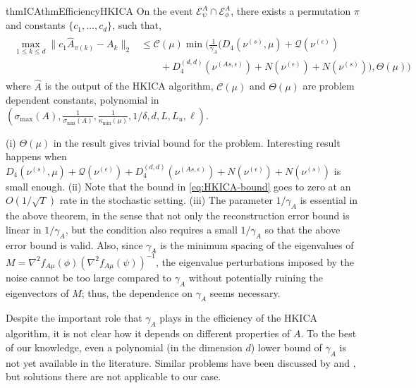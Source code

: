 \documentclass[11pt]{article}
\newcommand{\EA}[1]{\mathcal{E}^A_{#1}}
\newcommand{\Epsi}{\EA{\psi}}
\newcommand{\Ephi}{\EA{\phi}}
\newcommand{\cQ}{\mathcal{Q}}
\newcommand{\eps}{\epsilon}
\begin{document}
\begin{restatable}{thm}{ICAthmEfficiencyHKICA}
	\label{thm:efficiency} 
	On the event $\Epsi \cap \Ephi$, there exists a permutation $\pi$ and constants $\{c_1,\ldots,c_d\}$, such that,
	\begin{align}
	\label{eq:HKICA-bound}
	\begin{split}
	\max_{1\le k\le d}\| c_1\hat{A}_{\pi(k)} - A_k\|_2 & \le
	\mathcal{C}(\mu)\min\Big( \frac{1}{\gamma_A} (D_4(\nu^{(s)},\mu)+ \cQ(\nu^{(\eps)})  \\
	& 
	\qquad + D_4^{(d,d)}(\nu^{(As,\eps)}) +N(\nu^{(\eps)}) + N( \nu^{(s)})), \Theta(\mu) \Big)
	\end{split}
	\end{align}
	where $\hat{A}$ is the output of the HKICA algorithm, $\mathcal{C}(\mu)$ and $\Theta(\mu)$ are problem dependent constants, polynomial in $(\sigma_{\max}(A), \frac{1}{\sigma_{\min}(A)}, \frac{1}{\kappa_{\min}(\mu)},1/\delta, d, L, L_u, \ell)$.
\end{restatable}
\begin{remark}
	(i) $\Theta(\mu)$ in the result gives trivial bound for the problem. Interesting result happens when $D_4(\nu^{(s)},\mu)+ \cQ(\nu^{(\eps)}) + D_4^{(d,d)}(\nu^{(As,\eps)})
	+N(\nu^{(\eps)}) + N( \nu^{(s)})$ is small enough.
	(ii) Note that the bound in \eqref{eq:HKICA-bound} goes to zero at an $O(1/\sqrt{T})$ rate in the stochastic setting.
	(iii) The parameter $1/\gamma_A$ is essential in the above theorem, in the sense that not only the reconstruction error bound is linear in $1/\gamma_A$, but the condition also requires a small $1/\gamma_A$ so that the above error bound is valid. 
	Also, since $\gamma_A$ is the minimum spacing of the eigenvalues of $M=\nabla^2 f_{A\mu}(\phi) (\nabla^2 f_{A\mu}(\psi))^{-1}$, the eigenvalue perturbations imposed by the noise cannot be too large compared to $\gamma_A$ without potentially  ruining the eigenvectors of $M$; thus, the dependence on $\gamma_A$ seems necessary.
\end{remark}

Despite the important role that $\gamma_A$ plays in the efficiency of the HKICA algorithm, it is not clear how it depends on different properties of $A$.
To the best of our knowledge, even a polynomial (in the dimension $d$) lower bound of $\gamma_A$ is not yet available in the literature. 
Similar problems have been discussed by  \citet{husler1987minimal} and \citet{goyal2014fourier}, but solutions there are not applicable to our case.
\end{document}

